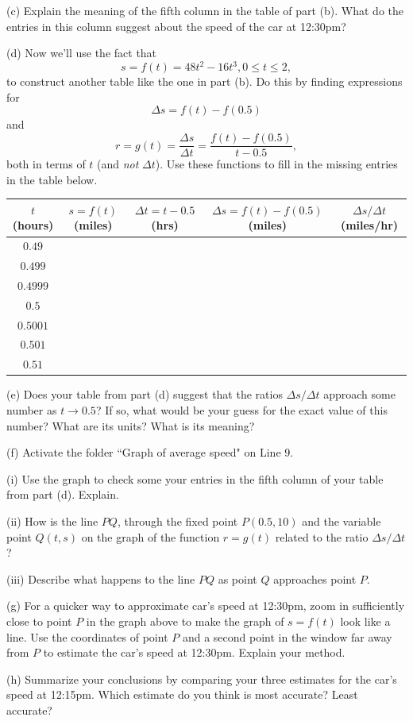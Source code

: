 \documentclass{ximera}
\begin{document}
\begin{example}
(c) Explain the meaning of the fifth column in the table of part (b). What do the entries in this column suggest about the speed of the car at 12:30pm?

(d) Now we'll use the fact that
\[
   s = f(t) = 48t^2 - 16t^3, 0 \leq t \leq 2 ,
\]
to construct another table like the one in part (b). Do this by finding expressions for 
\[
    \Delta s = f(t) - f(0.5)
\]
and
\[
   r = g(t) = \frac{\Delta s}{\Delta t} = \frac{f(t) - f(0.5)}{t-0.5} ,
\]
both in terms of $t$ (and \emph{not} $\Delta t$). Use these functions to fill in the missing entries in the table below.

\begin{center}
  \begin{tabular}{ | c| c | c | c | c |}
    \hline
    $t$ (hours) & $s = f(t)$ (miles) & $\Delta t = t-0.5$ (hrs)  & $\Delta s = f(t) - f(0.5)$ (miles) & $\Delta s/\Delta t$ (miles/hr)  \\ \hline
    $0.49$ &  &  &   &  \\ \hline
    $0.499$ &  &  &   &  \\ \hline
   $0.4999$ &  &  &   &  \\ \hline
    $0.5$  &   &  &  &   \\ \hline
    $0.5001$ &  & &   &  \\ \hline
    $0.501$ &  & &   &  \\ \hline
    $0.51$ &  &  &   &  \\ \hline
    \hline
  \end{tabular}
\end{center}


(e) Does  your table from part (d) suggest that the ratios $\Delta s/ \Delta t$ approach some number as $t\to 0.5$? If so, what would be your guess for the exact value of this number? What are its units? What is its meaning?

(f) Activate the folder ``Graph of average speed" on Line 9. 

(i) Use the graph to check some your entries in the fifth column of your table from part (d). Explain.

(ii) How is the line $PQ$, through the fixed point $P(0.5,10)$ and the variable point $Q(t,s)$ on the graph of the function $r=g(t)$ related to the ratio $\Delta s / \Delta t$?

(iii) Describe what happens to the line $PQ$ as point $Q$ approaches point $P$.

(g) For a quicker way to approximate car's speed at 12:30pm, zoom in sufficiently close to point $P$ in the graph above to make the graph of $s=f(t)$ look like a line. Use the coordinates of point $P$ and a second point in the window far away from $P$ to estimate the car's speed at 12:30pm. Explain your method.

(h) Summarize your conclusions by comparing your three estimates for the car's speed at 12:15pm. Which estimate do you think is most accurate? Least accurate?

\end{example}
\end{document}
